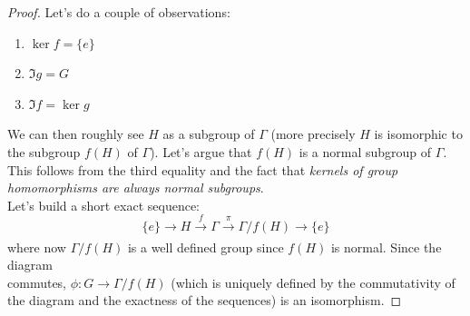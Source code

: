 \documentclass[11pt]{article}
\theoremstyle{definition}
\numberwithin{equation}{section}
\begin{document}
\begin{proof}
Let's do a couple of observations: 
    \begin{enumerate}
        \item $\ker f = \{e\} $
        \item $\Im g = G$
        \item $\Im f = \ker g$
    \end{enumerate}
We can then roughly see $H$ as a subgroup of $\Gamma$ (more precisely $H$ is isomorphic to the subgroup $f(H)$ of $\Gamma$). Let's argue that $f(H)$ is a normal subgroup of $\Gamma$. This follows from the third equality and the fact that \textit{kernels of group homomorphisms are always normal subgroups}. \\
Let's build a short exact sequence:
\begin{equation*}
      \{e\} \xrightarrow[]{} H  \xrightarrow[]{f} \Gamma \xrightarrow[]{\pi}   \Gamma / f(H) \xrightarrow[]{} \{e\}
\end{equation*}
where now $\Gamma/ f(H)$ is a well defined group since $f(H)$ is normal. Since the diagram\\
commutes, $\phi: G \to \Gamma/f(H)$ (which is uniquely defined by the commutativity of the diagram and the exactness of the sequences) is an isomorphism. 
\end{proof}
\end{document}
